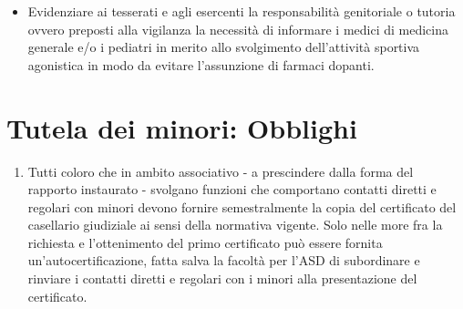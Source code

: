 \documentclass{djtsdoc}
\begin{document}
\begin{enumerate}
\begin{enumerate}
\begin{itemize}
				\item Evidenziare ai tesserati e agli esercenti la responsabilità genitoriale o tutoria ovvero preposti alla vigilanza la necessità di informare i medici di medicina generale e/o i pediatri in merito allo svolgimento dell'attività sportiva agonistica in modo da evitare l'assunzione di farmaci dopanti.
			\end{itemize}
		\end{enumerate}
	\end{enumerate}
	
	\section{Tutela dei minori: Obblighi}
	\begin{enumerate}
		\item Tutti coloro che in ambito associativo - a prescindere dalla forma del rapporto instaurato - svolgano funzioni che comportano contatti diretti e regolari con minori devono fornire semestralmente la copia del certificato del casellario giudiziale ai sensi della normativa vigente. Solo nelle more fra la richiesta e l'ottenimento del primo certificato può essere fornita un'autocertificazione, fatta salva la facoltà per l'ASD di subordinare e rinviare i contatti diretti e regolari con i minori alla presentazione del certificato.
	\end{enumerate}
	
\end{document}
